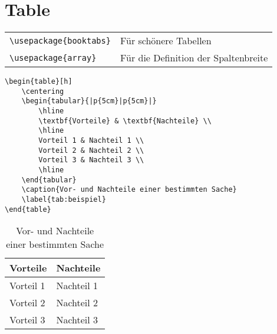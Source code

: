\section{Table}

\begin{tabular}{|p{}|p{}|}
    \hline
    \texttt{\textbackslash usepackage\{booktabs\}} & Für schönere Tabellen \\
    \texttt{\textbackslash usepackage\{array\}} & Für die Definition der Spaltenbreite \\
    \hline
\end{tabular}

\begin{verbatim}
\begin{table}[h]
    \centering
    \begin{tabular}{|p{5cm}|p{5cm}|} 
        \hline
        \textbf{Vorteile} & \textbf{Nachteile} \\
        \hline
        Vorteil 1 & Nachteil 1 \\
        Vorteil 2 & Nachteil 2 \\
        Vorteil 3 & Nachteil 3 \\
        \hline
    \end{tabular}
    \caption{Vor- und Nachteile einer bestimmten Sache}
    \label{tab:beispiel}
\end{table}    
\end{verbatim}

\begin{table}[h]
    \centering
    \begin{tabular}{|p{5cm}|p{5cm}|} 
        \hline
        \textbf{Vorteile} & \textbf{Nachteile} \\
        \hline
        Vorteil 1 & Nachteil 1 \\
        Vorteil 2 & Nachteil 2 \\
        Vorteil 3 & Nachteil 3 \\
        \hline
    \end{tabular}
    \caption{Vor- und Nachteile einer bestimmten Sache}
    \label{tab:beispiel}
\end{table}
